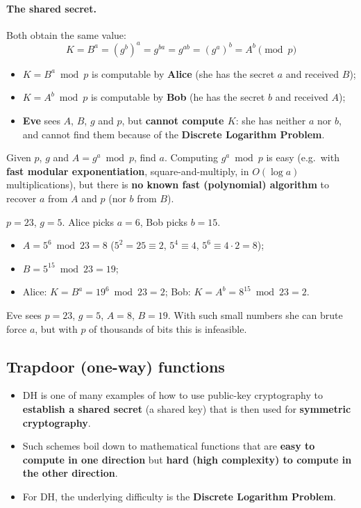 \paragraph{The shared secret.} Both obtain the same value:
\[
\boxed{K = B^a = (g^b)^a = g^{ba} = g^{ab} = (g^a)^b = A^b \pmod p}
\]
\begin{itemize}
    \item $K = B^a \bmod p$ is computable by \textbf{Alice} (she has the secret $a$ and received $B$);
    \item $K = A^b \bmod p$ is computable by \textbf{Bob} (he has the secret $b$ and received $A$);
    \item \textbf{Eve} sees $A$, $B$, $g$ and $p$, but \textbf{cannot compute $K$}: she has neither $a$ nor $b$, and cannot find them because of the \textbf{Discrete Logarithm Problem}.
\end{itemize}

\begin{definition}
Given $p$, $g$ and $A = g^a \bmod p$, find $a$. Computing $g^a \bmod p$ is easy (e.g.\ with \textbf{fast modular exponentiation}, square-and-multiply, in $O(\log a)$ multiplications), but there is \textbf{no known fast (polynomial) algorithm} to recover $a$ from $A$ and $p$ (nor $b$ from $B$).
\end{definition}

\begin{example}
$p = 23$, $g = 5$. Alice picks $a = 6$, Bob picks $b = 15$.
\begin{itemize}
    \item $A = 5^6 \bmod 23 = 8$ \quad ($5^2 = 25 \equiv 2$, $5^4 \equiv 4$, $5^6 \equiv 4 \cdot 2 = 8$);
    \item $B = 5^{15} \bmod 23 = 19$;
    \item Alice: $K = B^a = 19^6 \bmod 23 = 2$; \quad Bob: $K = A^b = 8^{15} \bmod 23 = 2$.
\end{itemize}
Eve sees $p = 23$, $g = 5$, $A = 8$, $B = 19$. With such small numbers she can brute force $a$, but with $p$ of thousands of bits this is infeasible.
\end{example}

\subsection{Trapdoor (one-way) functions}

\begin{itemize}
    \item DH is one of many examples of how to use public-key cryptography to \textbf{establish a shared secret} (a shared key) that is then used for \textbf{symmetric cryptography}.
    \item Such schemes boil down to mathematical functions that are \textbf{easy to compute in one direction} but \textbf{hard (high complexity) to compute in the other direction}.
    \item For DH, the underlying difficulty is the \textbf{Discrete Logarithm Problem}.
\end{itemize}

